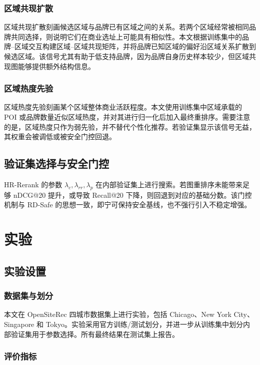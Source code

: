 \documentclass[10pt,twocolumn]{ctexart}
\begin{document}
\subsubsection{区域共现扩散}

区域共现扩散刻画候选区域与品牌已有区域之间的关系。若两个区域经常被相同品牌共同选择，则说明它们在商业选址上可能具有相似性。本文根据训练集中的品牌--区域交互构建区域--区域共现矩阵，并将品牌已知区域的偏好沿区域关系扩散到候选区域。该信号尤其有助于低支持品牌，因为品牌自身历史样本较少，但区域共现图能够提供额外结构信息。

\subsubsection{区域热度先验}

区域热度先验刻画某个区域整体商业活跃程度。本文使用训练集中区域承载的 POI 或品牌数量近似区域热度，并对其进行归一化后加入最终重排序。需要注意的是，区域热度只作为弱先验，并不替代个性化推荐。若验证集显示该信号无益，其权重会被调低或被安全门控回退。

\subsection{验证集选择与安全门控}

HR-Rerank 的参数 $\lambda_c,\lambda_{rr},\lambda_p$ 在内部验证集上进行搜索。若图重排序未能带来足够 nDCG@20 提升，或导致 Recall@20 下降，则回退到对应的基础分数。该门控机制与 RD-Safe 的思想一致，即宁可保持安全基线，也不强行引入不稳定增强。

\section{实验}

\subsection{实验设置}

\subsubsection{数据集与划分}

本文在 OpenSiteRec 四城市数据集上进行实验，包括 Chicago、New York City、Singapore 和 Tokyo。实验采用官方训练/测试划分，并进一步从训练集中划分内部验证集用于参数选择。所有最终结果在测试集上报告。

\subsubsection{评价指标}
\end{document}
